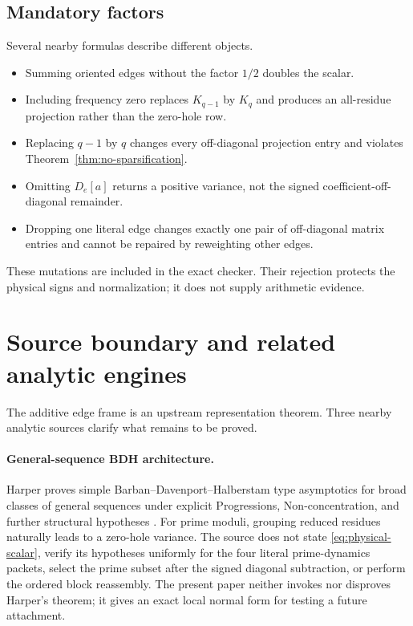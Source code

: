 \documentclass[11pt]{article}
\begin{document}
\subsection{Mandatory factors}

Several nearby formulas describe different objects.
\begin{itemize}[leftmargin=2em]
  \item Summing oriented edges without the factor $1/2$ doubles the scalar.
  \item Including frequency zero replaces $K_{q-1}$ by $K_q$ and produces an
  all-residue projection rather than the zero-hole row.
  \item Replacing $q-1$ by $q$ changes every off-diagonal projection entry and
  violates Theorem~\ref{thm:no-sparsification}.
  \item Omitting $D_e[a]$ returns a positive variance, not the signed
  coefficient-off-diagonal remainder.
  \item Dropping one literal edge changes exactly one pair of off-diagonal
  matrix entries and cannot be repaired by reweighting other edges.
\end{itemize}

These mutations are included in the exact checker.  Their rejection protects
the physical signs and normalization; it does not supply arithmetic evidence.

\section{Source boundary and related analytic engines}

The additive edge frame is an upstream representation theorem.  Three nearby
analytic sources clarify what remains to be proved.

\paragraph{General-sequence BDH architecture.}
Harper proves simple Barban--Davenport--Halberstam type asymptotics for broad
classes of general sequences under explicit Progressions,
Non-concentration, and further structural hypotheses
\cite{Harper2024}.  For prime moduli, grouping reduced residues naturally
leads to a zero-hole variance.  The source does not state
\eqref{eq:physical-scalar}, verify its hypotheses uniformly for the four
literal prime-dynamics packets, select the prime subset after the signed
diagonal subtraction, or perform the ordered block reassembly.  The present
paper neither invokes nor disproves Harper's theorem; it gives an exact local
normal form for testing a future attachment.
\end{document}
